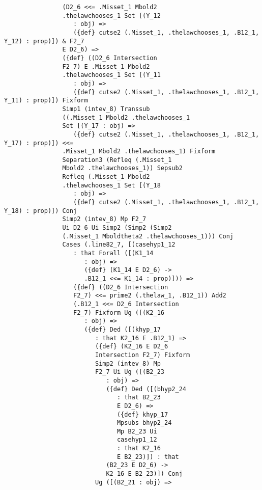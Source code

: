 \documentclass[12pt]{article}
\begin{document}
\begin{verbatim}
                (D2_6 <<= .Misset_1 Mbold2 
                .thelawchooses_1 Set [(Y_12 
                   : obj) => 
                   ({def} cutse2 (.Misset_1, .thelawchooses_1, .B12_1, Y_12) : prop)]) & F2_7 
                E D2_6) => 
                ({def} ((D2_6 Intersection 
                F2_7) E .Misset_1 Mbold2 
                .thelawchooses_1 Set [(Y_11 
                   : obj) => 
                   ({def} cutse2 (.Misset_1, .thelawchooses_1, .B12_1, Y_11) : prop)]) Fixform 
                Simp1 (intev_8) Transsub 
                ((.Misset_1 Mbold2 .thelawchooses_1 
                Set [(Y_17 : obj) => 
                   ({def} cutse2 (.Misset_1, .thelawchooses_1, .B12_1, Y_17) : prop)]) <<= 
                .Misset_1 Mbold2 .thelawchooses_1) Fixform 
                Separation3 (Refleq (.Misset_1 
                Mbold2 .thelawchooses_1)) Sepsub2 
                Refleq (.Misset_1 Mbold2 
                .thelawchooses_1 Set [(Y_18 
                   : obj) => 
                   ({def} cutse2 (.Misset_1, .thelawchooses_1, .B12_1, Y_18) : prop)]) Conj 
                Simp2 (intev_8) Mp F2_7 
                Ui D2_6 Ui Simp2 (Simp2 (Simp2 
                (.Misset_1 Mboldtheta2 .thelawchooses_1))) Conj 
                Cases (.line82_7, [(casehyp1_12 
                   : that Forall ([(K1_14 
                      : obj) => 
                      ({def} (K1_14 E D2_6) -> 
                      .B12_1 <<= K1_14 : prop)])) => 
                   ({def} ((D2_6 Intersection 
                   F2_7) <<= prime2 (.thelaw_1, .B12_1)) Add2 
                   (.B12_1 <<= D2_6 Intersection 
                   F2_7) Fixform Ug ([(K2_16 
                      : obj) => 
                      ({def} Ded ([(khyp_17 
                         : that K2_16 E .B12_1) => 
                         ({def} (K2_16 E D2_6 
                         Intersection F2_7) Fixform 
                         Simp2 (intev_8) Mp 
                         F2_7 Ui Ug ([(B2_23 
                            : obj) => 
                            ({def} Ded ([(bhyp2_24 
                               : that B2_23 
                               E D2_6) => 
                               ({def} khyp_17 
                               Mpsubs bhyp2_24 
                               Mp B2_23 Ui 
                               casehyp1_12 
                               : that K2_16 
                               E B2_23)]) : that 
                            (B2_23 E D2_6) -> 
                            K2_16 E B2_23)]) Conj 
                         Ug ([(B2_21 : obj) => 

\end{verbatim}
\end{document}

